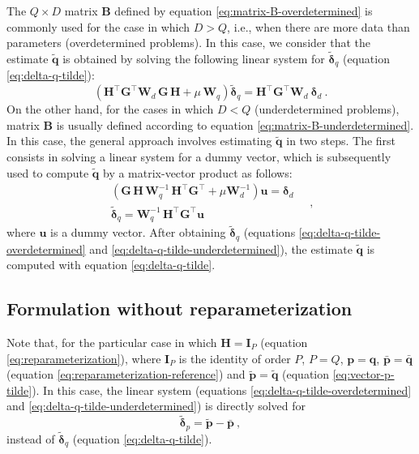 \documentclass[utf8]{FrontiersinHarvard} %
\begin{document}
	The $Q \times D$ matrix $\mathbf{B}$ defined by equation \ref{eq:matrix-B-overdetermined} is commonly used for the case 
	in which $D > Q$, i.e., when there are more data than parameters (overdetermined problems).
	In this case, we consider that the estimate $\tilde{\mathbf{q}}$ is obtained by solving the following linear system
	for $\tilde{\boldsymbol{\delta}}_{q}$ (equation \ref{eq:delta-q-tilde}):
	\begin{equation}
		\left( \mathbf{H}^{\top} \mathbf{G}^{\top} \mathbf{W}_{d} \, \mathbf{G} \, \mathbf{H} + 
		\mu \, \mathbf{W}_{q} \right) 
		\tilde{\boldsymbol{\delta}}_{q} = 
		\mathbf{H}^{\top} \mathbf{G}^{\top} \mathbf{W}_{d} \: 
		\boldsymbol{\delta}_{d} \: .
		\label{eq:delta-q-tilde-overdetermined}
	\end{equation}
	On the other hand, for the cases in which $D < Q$ (underdetermined problems), matrix $\mathbf{B}$ is 
	usually defined according to equation \ref{eq:matrix-B-underdetermined}. In this case, the general approach involves 
	estimating $\tilde{\mathbf{q}}$ in two steps. The first consists in solving a linear system 
	for a dummy vector, which is subsequently used to compute $\tilde{\mathbf{q}}$ by a matrix-vector product as follows:
	\begin{equation}
		\begin{split}
			\left( \mathbf{G} \, \mathbf{H} \, \mathbf{W}_{q}^{-1} \,
			\mathbf{H}^{\top}\mathbf{G}^{\top} + \mu \mathbf{W}_{d}^{-1} \right)  
			\mathbf{u} = \boldsymbol{\delta}_{d} \\
			\tilde{\boldsymbol{\delta}}_{q} = \mathbf{W}_{q}^{-1} \, \mathbf{H}^{\top} \mathbf{G}^{\top} \mathbf{u}
		\end{split} \quad ,
		\label{eq:delta-q-tilde-underdetermined}
	\end{equation}
	where $\mathbf{u}$ is a dummy vector.
	After obtaining $\tilde{\boldsymbol{\delta}}_{q}$ (equations \ref{eq:delta-q-tilde-overdetermined} and \ref{eq:delta-q-tilde-underdetermined}),
	the estimate $\tilde{\mathbf{q}}$ is computed with equation \ref{eq:delta-q-tilde}.
	
	\subsection{Formulation without reparameterization}
	\label{subsec:formulation-without-reparameterization}
	
	Note that, for the particular case in which $\mathbf{H} = \mathbf{I}_{P}$ (equation \ref{eq:reparameterization}), 
	where $\mathbf{I}_{P}$ is the identity of order $P$, 
	$P = Q$, $\mathbf{p} = \mathbf{q}$, $\bar{\mathbf{p}} = \bar{\mathbf{q}}$ (equation \ref{eq:reparameterization-reference}) and 
	$\tilde{\mathbf{p}} = \tilde{\mathbf{q}}$ (equation \ref{eq:vector-p-tilde}).
	In this case, the linear system (equations \ref{eq:delta-q-tilde-overdetermined} and \ref{eq:delta-q-tilde-underdetermined}) is directly 
	solved for 
	\begin{equation}
		\tilde{\boldsymbol{\delta}}_{p} = \tilde{\mathbf{p}} - \bar{\mathbf{p}} \: ,
		\label{eq:delta-p-tilde}
	\end{equation}
	instead of $\tilde{\boldsymbol{\delta}}_{q}$ (equation \ref{eq:delta-q-tilde}).
	
\end{document}
